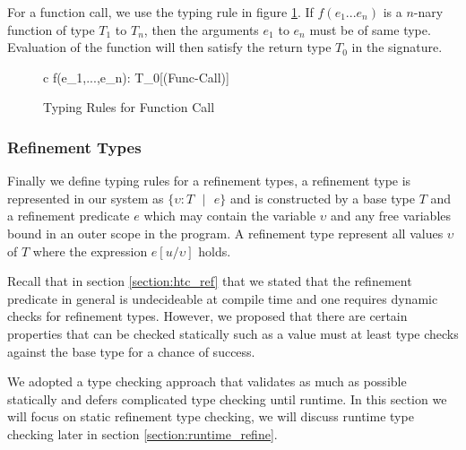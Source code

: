 \documentclass[a4paper,12pt]{report}
\begin{document}
\par
For a function call, we use the typing rule in figure \ref{fig:type_check_f_call}. 
If $f(e_1...e_n)$ is a $n$-nary function of type $T_1$ to $T_n$, 
then the arguments $e_1$ to $e_n$ must be of same type. 
Evaluation of the function will then satisfy the return type $T_0$ in the signature. 

\begin{figure}[H]
  \begin{center}
    \begin{tabular} {c}
        {\Gamma \vdash f(e_1,\text{ }...\text{ },e_n): T_0}[(Func-Call)]
    \end{tabular}
  \end{center}
  \caption{Typing Rules for Function Call}
  \label{fig:type_check_f_call}
\end{figure}

\subsubsection{Refinement Types} \label{section:ref_type_check}
Finally we define typing rules for a refinement types, a refinement type 
is represented in our system as $\{\upsilon : T\text{ }|\text{ }e\}$ and is 
constructed by a base type $T$ and a refinement predicate $e$ which may contain 
the variable $\upsilon$ and any free variables bound in an outer scope 
in the program. A refinement type represent all values $\upsilon$ 
of $T$ where the expression $e[u/\upsilon]$ holds. 

\par
Recall that in section \ref{section:htc_ref} that we stated that the refinement 
predicate in general is undecideable at compile time and one requires dynamic 
checks for refinement types. However, we proposed that there are certain 
properties that can be checked statically such as a value must at least 
type checks against the base type for a chance of success. 

\par
We adopted a type checking approach that validates as much as possible 
statically and defers complicated type 
checking until runtime. In this section we will focus on static refinement type 
checking, we will discuss runtime type checking later in section 
\ref{section:runtime_refine}.
\end{document}
